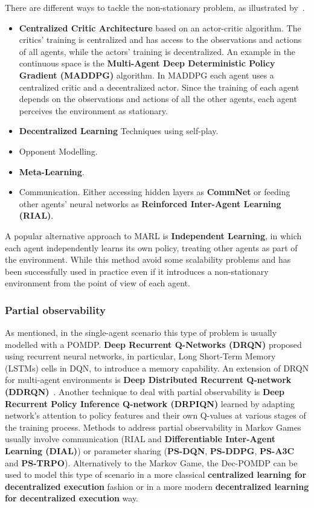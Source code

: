 \documentclass[11pt, a4paper, hidelinks]{report}
\begin{document}
There are different ways to tackle the non-stationary problem, as illustrated by~\citep{papoudakis2019dealing}.
\begin{itemize}
	\item \textbf{Centralized Critic Architecture} based on an actor-critic algorithm.
The critics' training is centralized and has access to the observations and actions of all agents, while the actors' training is decentralized.
An example in the continuous space is the \textbf{Multi-Agent Deep Deterministic Policy Gradient (MADDPG)} algorithm.
In MADDPG each agent uses a centralized critic and a decentralized actor.
Since the training of each agent depends on the observations and actions of all the other agents, each agent perceives the environment as stationary.
	\item \textbf{Decentralized Learning} Techniques using self-play.
	\item Opponent Modelling.
	\item \textbf{Meta-Learning}.
	\item Communication.
Either accessing hidden layers as \textbf{CommNet} or feeding other agents' neural networks as \textbf{Reinforced Inter-Agent Learning (RIAL)}.
\end{itemize}

A popular alternative approach to MARL is \textbf{Independent Learning}, in which each agent independently learns its own policy, treating other agents as part of the environment.
While this method avoid some scalability problems and has been successfully used in practice even if it introduces a non-stationary environment from the point of view of each agent.

\subsubsection{Partial observability}

As mentioned, in the single-agent scenario this type of problem is usually modelled with a POMDP\@.
\textbf{Deep Recurrent Q-Networks (DRQN)} proposed using recurrent neural networks, in particular, Long Short-Term Memory (LSTMs) cells in DQN, to introduce a memory capability.
An extension of DRQN for multi-agent environments is \textbf{Deep Distributed Recurrent Q-network (DDRQN)}~\citep{Nguyen-2020}.
Another technique to deal with partial observability is \textbf{Deep Recurrent Policy Inference Q-network (DRPIQN)} learned by adapting network’s attention to policy features and their own Q-values at various stages of the training process.
Methods to address partial observability in Markov Games usually involve communication (RIAL and \textbf{Differentiable Inter-Agent Learning (DIAL)}) or parameter sharing (\textbf{PS-DQN}, \textbf{PS-DDPG}, \textbf{PS-A3C} and \textbf{PS-TRPO}).
Alternatively to the Markov Game, the Dec-POMDP can be used to model this type of scenario in a more classical \textbf{centralized learning for decentralized execution} fashion or in a more modern \textbf{decentralized learning for decentralized execution} way.
\end{document}
